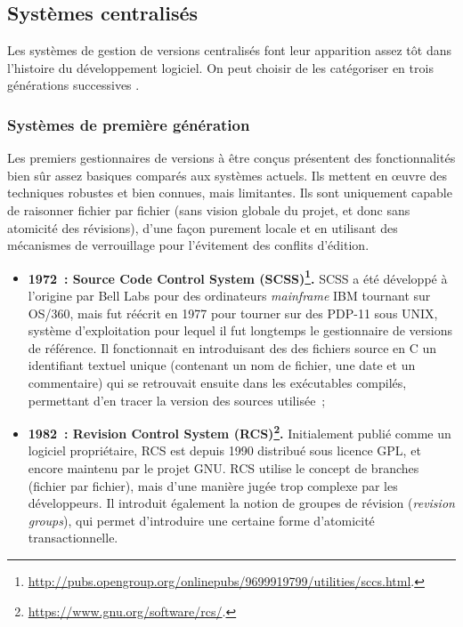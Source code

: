 \subsection{Systèmes centralisés} %

Les systèmes de gestion de versions centralisés font leur apparition
assez tôt dans l'histoire du développement logiciel. On peut choisir
de les catégoriser en trois générations successives \cite{Baire1}.

\subsubsection{Systèmes de première génération}

Les premiers gestionnaires de versions à être conçus présentent des
fonctionnalités bien sûr assez basiques comparés aux systèmes
actuels. Ils mettent en \oe uvre des techniques robustes et bien
connues, mais limitantes. Ils sont uniquement capable de raisonner
fichier par fichier (sans vision globale du projet, et donc sans
atomicité des révisions), d'une façon purement locale et en utilisant
des mécanismes de verrouillage pour l'évitement des conflits
d'édition.

\begin{itemize}
\item \textbf{1972~: Source Code Control System
    (SCSS)\footnote{\url{http://pubs.opengroup.org/onlinepubs/9699919799/utilities/sccs.html}.}.}
  SCSS a été développé à l'origine par Bell Labs pour des ordinateurs
  \textit{mainframe} IBM tournant sur OS/360, mais fut
  réécrit en 1977 pour tourner sur des PDP-11 sous UNIX,
  système d'exploitation pour lequel il fut longtemps le gestionnaire
  de versions de référence. Il fonctionnait en introduisant des des
  fichiers source en C un identifiant textuel unique (contenant un nom
  de fichier, une date et un commentaire) qui se retrouvait ensuite
  dans les exécutables compilés, permettant d'en tracer la version des
  sources utilisée~;
\item \textbf{1982~: Revision Control System
    (RCS)\footnote{\url{https://www.gnu.org/software/rcs/}.}.}
  Initialement publié comme un logiciel propriétaire, RCS est depuis
  1990 distribué sous licence GPL, et encore maintenu par le projet
  GNU. RCS utilise le concept de branches (fichier par fichier), mais
  d'une manière jugée trop complexe par les développeurs. Il introduit
  également la notion de groupes de révision (\textit{revision
    groups}), qui permet d'introduire une certaine forme d'atomicité
  transactionnelle.
\end{itemize}

